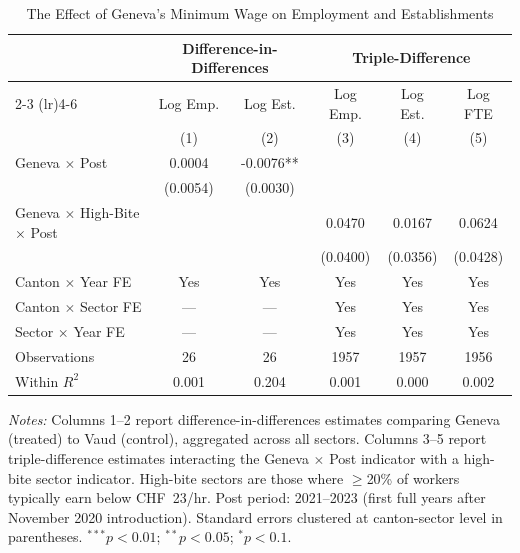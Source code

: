 \begin{table}[htbp]
\centering
\caption{The Effect of Geneva's Minimum Wage on Employment and Establishments}
\label{tab:main}
\begin{threeparttable}
\begin{tabular}{lccccc}
\toprule
 & \multicolumn{2}{c}{Difference-in-Differences} & \multicolumn{3}{c}{Triple-Difference} \\
\cmidrule(lr){2-3} \cmidrule(lr){4-6}
 & Log Emp. & Log Est. & Log Emp. & Log Est. & Log FTE \\
 & (1) & (2) & (3) & (4) & (5) \\
\midrule
Geneva $\times$ Post & 0.0004 & -0.0076** & & & \\
 & (0.0054) & (0.0030) & & & \\
Geneva $\times$ High-Bite $\times$ Post & & & 0.0470 & 0.0167 & 0.0624 \\
 & & & (0.0400) & (0.0356) & (0.0428) \\
\midrule
Canton $\times$ Year FE & Yes & Yes & Yes & Yes & Yes \\
Canton $\times$ Sector FE & --- & --- & Yes & Yes & Yes \\
Sector $\times$ Year FE & --- & --- & Yes & Yes & Yes \\
Observations & 26 & 26 & 1957 & 1957 & 1956 \\
Within $R^2$ & 0.001 & 0.204 & 0.001 & 0.000 & 0.002 \\
\bottomrule
\end{tabular}
\begin{tablenotes}[flushleft]
\small
\item \textit{Notes:} Columns 1--2 report difference-in-differences estimates comparing
Geneva (treated) to Vaud (control), aggregated across all sectors.
Columns 3--5 report triple-difference estimates interacting the Geneva $\times$ Post
indicator with a high-bite sector indicator. High-bite sectors are those where $\geq$20\%
of workers typically earn below CHF~23/hr. Post period: 2021--2023 (first full years after
November 2020 introduction). Standard errors clustered at canton-sector level in parentheses.
$^{***}p<0.01$; $^{**}p<0.05$; $^{*}p<0.1$.
\end{tablenotes}
\end{threeparttable}
\end{table}
